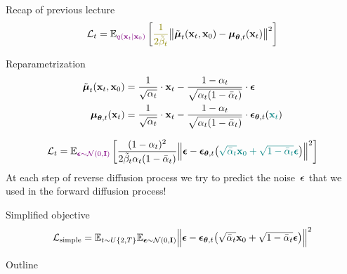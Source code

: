 \begin{frame}{Recap of previous lecture}
	\vspace{-0.3cm}
	\[
		\cL_t = \bbE_{\color{violet}q(\bx_t | \bx_0)} \left[ {\color{olive}\frac{1}{2\tilde{\beta}_t}} \bigl\| \tilde{\bmu}_t(\bx_t, \bx_0) - \bmu_{\btheta, t}(\bx_t) \bigr\|^2  \right]
	\]
	\vspace{-0.3cm}
	\begin{block}{Reparametrization}
		\vspace{-0.7cm}
		\begin{align*}
			\tilde{\boldsymbol{\mu}}_t(\mathbf{x}_t, \mathbf{x}_0) &= \frac{1}{\sqrt{\alpha_t}} \cdot \mathbf{x}_t - \frac{1 - \alpha_t}{\sqrt{\alpha_t (1 - \bar{\alpha}_t)}} \cdot \boldsymbol{\epsilon} \\
			\boldsymbol{\mu}_{\boldsymbol{\theta}, t}(\mathbf{x}_t) &= \frac{1}{\sqrt{\alpha_t}} \cdot \mathbf{x}_t - \frac{1 - \alpha_t}{\sqrt{\alpha_t (1 - \bar{\alpha}_t)}} \cdot \boldsymbol{\epsilon}_{\boldsymbol{\theta}, t}({\color{teal}\mathbf{x}_t})
		\end{align*}
		\vspace{-0.7cm}
	\end{block}
	\vspace{-0.2cm}
	\[
		\mathcal{L}_t  =	 \mathbb{E}_{\color{violet}\boldsymbol{\epsilon} \sim \mathcal{N}(0, \mathbf{I})} \left[ \frac{(1 - \alpha_t)^2}{2\tilde{\beta}_t \alpha_t (1 - \bar{\alpha}_t)} \Bigl\| \boldsymbol{\epsilon} - \boldsymbol{\epsilon}_{\boldsymbol{\theta}, t}\bigl( {\color{teal}\sqrt{\bar{\alpha}_t} \mathbf{x}_0 + \sqrt{1 - \bar{\alpha}_t} \boldsymbol{\epsilon}}\bigr) \Bigr\|^2 \right]
	\]
	At each step of reverse diffusion process we try to predict the noise~$\boldsymbol{\epsilon}$ that we used in the forward diffusion process!
	\begin{block}{Simplified objective}
		\vspace{-0.7cm}
		\[
			 \mathcal{L}_{\text{simple}} = \mathbb{E}_{t \sim U\{2, T\}} \mathbb{E}_{\boldsymbol{\epsilon} \sim \mathcal{N}(0, \mathbf{I})} \Bigl\| \boldsymbol{\epsilon} - \boldsymbol{\epsilon}_{\boldsymbol{\theta}, t}\bigl( \sqrt{\bar{\alpha}_t} \mathbf{x}_0 + \sqrt{1 - \bar{\alpha}_t} \boldsymbol{\epsilon}\bigr) \Bigr\|^2 
		\]
	\end{block}
	\end{frame}
\begin{frame}{Outline}
	\tableofcontents
\end{frame}
